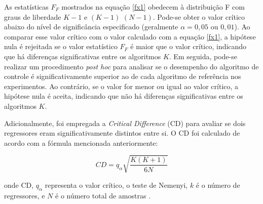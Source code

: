  
As estatísticas $F_F$ mostrados na equação \eqref{fx1} obedecem à distribuição F com graus de liberdade $K-1$ e $(K-1)$ $(N-1)$. Pode-se obter o valor crítico abaixo do nível de significância especificado (geralmente $\alpha = 0,05$ ou $0,01$). Ao comparar esse valor crítico com o valor calculado com a equação \eqref{fx1}, a hipótese nula é rejeitada se o valor estatístico $F_F$ é maior que o valor crítico, indicando que há diferenças significativas entre os algoritmos $K$. Em seguida, pode-se realizar um procedimento \textit{post hoc} para analisar se o desempenho do algoritmo de controle é significativamente superior ao de cada algoritmo de referência nos experimentos. Ao contrário, se o valor for menor ou igual ao valor crítico, a hipótese nula é aceita, indicando que não há diferenças significativas entre os algoritmos $K$.
  
Adicionalmente, foi empregada a \textit{Critical Difference} (CD) para avaliar se dois regressores eram significativamente distintos entre si. O CD foi calculado de acordo com a fórmula mencionada anteriormente:

\begin{equation}
	CD = q_\alpha \sqrt{\frac{K(K+1)}{6N}}
\end{equation}

\noindent onde CD, $q_\alpha$ representa o valor crítico, o teste de Nemenyi, $k$ é o número de regressores, e $N$ é o número total de amostras \cite{Liu2022}.
 
 
 

